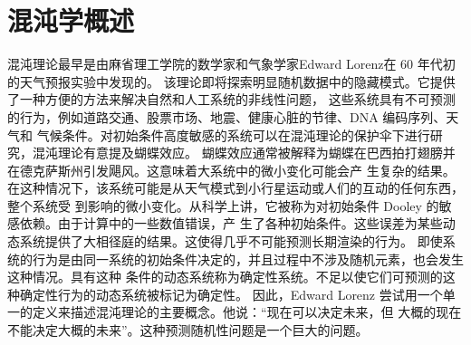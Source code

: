 \section{混沌学概述}

混沌理论最早是由麻省理工学院的数学家和气象学家Edward Lorenz在 60 年代初的天气预报实验中发现的。
该理论即将探索明显随机数据中的隐藏模式。它提供了一种方便的方法来解决自然和人工系统的非线性问题，
这些系统具有不可预测的行为，例如道路交通、股票市场、地震、健康心脏的节律、DNA 编码序列、天气和
气候条件。对初始条件高度敏感的系统可以在混沌理论的保护伞下进行研究，混沌理论有意提及蝴蝶效应。
蝴蝶效应通常被解释为蝴蝶在巴西拍打翅膀并在德克萨斯州引发飓风。这意味着大系统中的微小变化可能会产
生复杂的结果。在这种情况下，该系统可能是从天气模式到小行星运动或人们的互动的任何东西，整个系统受
到影响的微小变化。从科学上讲，它被称为对初始条件 Dooley 的敏感依赖。由于计算中的一些数值错误，产
生了各种初始条件。这些误差为某些动态系统提供了大相径庭的结果。这使得几乎不可能预测长期渲染的行为。
即使系统的行为是由同一系统的初始条件决定的，并且过程中不涉及随机元素，也会发生这种情况。具有这种
条件的动态系统称为确定性系统。不足以使它们可预测的这种确定性行为的动态系统被标记为确定性。
因此，Edward Lorenz 尝试用一个单一的定义来描述混沌理论的主要概念。他说：“现在可以决定未来，但
大概的现在不能决定大概的未来”。这种预测随机性问题是一个巨大的问题。
